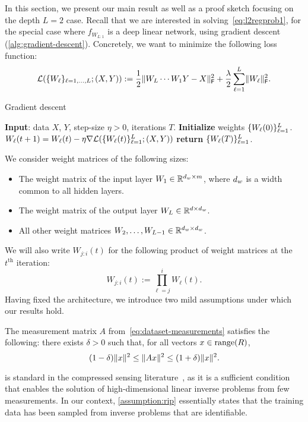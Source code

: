 In this section, we present our main result as well as a proof sketch focusing
on the depth $L = 2$ case. Recall that we are interested in solving~\eqref{eq:l2regprob1},
for the special case where $f_{W_{L:1}}$ is a deep linear network, using gradient
descent (\cref{alg:gradient-descent}). Concretely,
we want to minimize the following loss function:
\begin{equation}
	\mathcal{L}(\{W_{\ell}\}_{\ell = 1, \dots, L}; (X, Y)) :=
	\frac{1}{2} \lVert W_{L} \cdots W_{1} Y - X\rVert_{\mathsf{F}}^2 + \frac{\lambda}{2} \sum_{\ell=1}^{L} \lVert W_{\ell}\rVert_{\mathsf{F}}^2.
	\label{eq:loss-function}
\end{equation}
\begin{algorithm}[tb]
	\caption{Gradient descent}
	\label{alg:gradient-descent}
	\begin{algorithmic}
		\State \textbf{Input}: data $X$, $Y$, step-size $\eta > 0$, iterations $T$.
		\State \textbf{Initialize} weights $\{W_{\ell}(0)\}_{\ell=1}^{L}$.
		\State $W_{\ell}(t+1) = W_{\ell}(t) - \eta \nabla \mathcal{L}(\{W_{\ell}(t)\}_{\ell=1}^{L}; (X, Y))$
		\EndFor
		\State \textbf{return} $\{W_{\ell}(T)\}_{\ell=1}^{L}$.
	\end{algorithmic}
\end{algorithm}
We consider weight matrices of the following sizes:
\begin{itemize}[itemsep=0ex]
	\item The weight matrix of the input layer $W_{1} \in \mathbb{R}^{d_{w} \times m}$,
	      where $d_{w}$ is a width common to all hidden layers.
	\item The weight matrix of the output layer $W_{L} \in \mathbb{R}^{d \times d_{w}}$.
	\item All other weight matrices $W_{2}, \dots, W_{L-1} \in \mathbb{R}^{d_{w} \times d_{w}}$.
\end{itemize}
We will also write $W_{j:i}(t)$ for the following product of weight matrices at the $t^{\text{th}}$ iteration:
\begin{equation}
	W_{j:i}(t) := \prod_{\ell = j}^{i} W_{\ell}(t).
	\label{eq:folded-product}
\end{equation}
Having fixed the architecture, we introduce two mild assumptions under
which our results hold.
\begin{assumption}
	\label{assumption:rip}
	The measurement matrix $A$ from~\eqref{eq:dataset-measurements}
	satisfies the following: there exists $\delta > 0$ such that,
	for all vectors $x \in \mathrm{range}(R)$,
	\begin{equation}
		(1 - \delta) \lVert x\rVert^2 \leq \lVert Ax\rVert^2 \leq (1 + \delta) \lVert x\rVert^2.
		\label{eq:rip}
	\end{equation}
\end{assumption}
 is standard
in the compressed sensing literature~\cite{foucart2013invitation}, as it is
a sufficient condition that enables the solution of high-dimensional linear inverse
problems from few measurements. In our context,
\cref{assumption:rip} essentially states that the
training data has been sampled from inverse problems that are identifiable.

